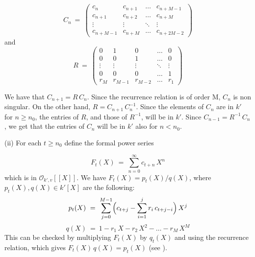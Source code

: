 \begin{equation}
C_n\ =
\ \left(
\begin{array}{llll}
              c_n & c_{n+1} & \hdots & c_{n+M-1} \\
              c_{n+1} & c_{n+2} & \hdots  & c_{n+M} \\
              \vdots & \vdots & \ddots & \vdots \\
              c_{n+M-1} & c_{n+M} & \hdots & c_{n+2M-2}
\end{array}
\right)
\end{equation}
and
\begin{equation}
R\ =
\ \left(
\begin{array}{lllll}
              0 & 1 & 0 & \hdots & 0 \\
              0 & 0 & 1 & \hdots & 0 \\
             \vdots & \vdots & \vdots & \ddots & \vdots \\
              0 & 0 & 0 & \hdots & 1 \\
              r_M & r_{M-1} & r_{M-2} & \hdots & r_1 
\end{array}
\right)
\end{equation} 

We have that $C_{n+1} = R\,C_n$. Since the recurrence 
relation is of order M, $C_n$ is non singular. 
On the other hand, $R = C_{n+1}\,C_{n}^{-1}$. Since the 
elements of $C_n$ are in $k'$ for $n \geq n_0$, the entries 
of $R$, and those of $R^{-1}$, will be in $k'$. Since 
$C_{n-1} = R^{-1}\,C_n$, we get that the entries of 
$C_n$ will be in $k'$ also for $n < n_0$. 

\item{(ii)} For each $t \geq n_0$ define the formal 
power series 

\begin{equation}
F_t(X)\ =\ \sum_{n=0}^{\infty} c_{t+n}\,X^n
\end{equation}
which is in $\mathcal O_{k',v}[[X]]$. 
We have $F_t(X) = p_t(X)/q(X)$, 
where $p_t(X),q(X) \in k'[X]$ are the following:
\begin{equation}
p_t(X)\ =\ \sum_{j=0}^{M-1} \Bigl( c_{t+j} - 
                    \sum_{i=1}^{j} r_i\,c_{t+j-i} \Bigr)\,X^j
\end{equation}
\begin{equation}
q(X)\ =\ 1 - r_1\,X - r_2\,X^2 - \dots - r_M\,X^M
\end{equation}
This can be checked by multiplying $F_t(X)$ by $q_t(X)$ 
and using the recurrence relation, which gives 
$F_t(X)\,q(X) = p_t(X)$ (see \cite{poorten:sp}). 


